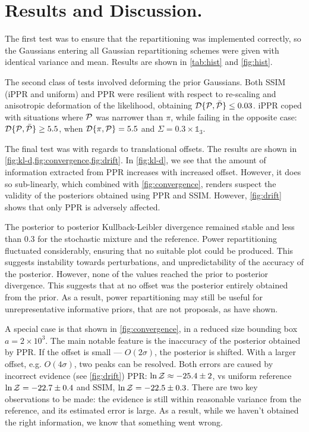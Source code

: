 \documentclass[usenatbib]{mnras}
\begin{document}
\section{Results and Discussion.}\label{sec:results}
The first test was to ensure that the repartitioning was implemented
correctly, so the Gaussians entering all Gaussian repartitioning
schemes were given with identical variance and mean. Results are shown
in \cref{tab:hist} and \cref{fig:hist}.


The second class of tests involved deforming the prior Gaussians.
Both SSIM (iPPR and uniform) and PPR were resilient with respect to
re-scaling and anisotropic deformation of the likelihood, obtaining
${\cal D}\{ {\cal P}, \bar{\cal P}\} \leq 0.03$. iPPR coped with
situations where ${\cal P}$ was narrower than $\pi$, while failing in
the opposite case: ${\cal D}\{ {\cal P}, \bar{\cal P}\} \geq 5.5$,
when ${\cal D}\{ \pi, {\cal P} \} = 5.5$ and
$\Sigma = 0.3 \times \mathds{1}_{3}$.

The final test was with regards to translational offsets. The results
are shown in \cref{fig:kl-d,fig:convergence,fig:drift}. In
\cref{fig:kl-d}, we see that the amount of information extracted from
PPR increases with increased offset. However, it does so sub-linearly,
which combined with \cref{fig:convergence}, renders suspect the
validity of the posteriors obtained using PPR and SSIM. However,
\cref{fig:drift} shows that only PPR is adversely affected.

The posterior to posterior Kullback-Leibler divergence remained stable
and less than \(0.3\) for the stochastic mixture and the
reference. Power repartitioning fluctuated considerably, ensuring that
no suitable plot could be produced. This suggests instability towards
perturbations, and unpredictability of the accuracy of the
posterior. However, none of the values reached the prior to posterior
divergence. This suggests that at no offset was the posterior entirely
obtained from the prior. As a result, power repartitioning may still
be useful for unrepresentative informative priors, that are not
proposals, as \cite{chen-ferroz-hobson} have shown. 

A special case is that shown in \cref{fig:convergence}, in a reduced
size bounding box \(a=2\times 10^{3}\). The main notable feature is
the inaccuracy of the posterior obtained by PPR. If the offset is
small --- \(O(2\sigma)\), the posterior is shifted. With a larger
offset, e.g. \(O(4\sigma)\), two peaks can be resolved.  Both errors
are caused by incorrect evidence (see \cref{fig:drift}) PPR:
\(\ln {\cal Z}\approx -25.4 \pm 2\), vs uniform reference
\(\ln {\cal Z} = -22.7 \pm 0.4\) and SSIM,
\(\ln {\cal Z} = -22.5 \pm 0.3\). There are two key observations to be
made: the evidence is still within reasonable variance from the
reference, and its estimated error is large. As a result, while we
haven't obtained the right information, we know that something went
wrong.
\end{document}
